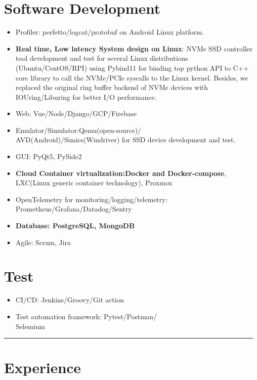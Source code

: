 \documentclass[11pt]{article}
\begin{document}
\begin{multicols*}{2}
\section*{Software Development}\label{software-dev}
\begin{itemize}[noitemsep]
    \item Profiler: perfetto/logcat/protobuf on Android Linux platform.
    \item \textbf{Real time, Low latency System design on Linux}: NVMe SSD controller tool development and test for several Linux distributions (Ubuntu/CentOS/RPI) using Pybind11 for binding top python API to C++ core library to call the NVMe/PCIe syscalls to the Linux kernel. Besides, we replaced the original ring buffer backend of  NVMe devices with IOUring/Liburing for better I/O performance.
    \item Web: Vue/Node/Django/GCP/Firebase
    \item Emulator/Simulator:Qemu(open-source)/\\AVD(Android)/Simics(Windriver) for SSD device development and test.
    \item GUI: PyQt5, PySide2
    \item \textbf{Cloud Container virtualization:Docker and Docker-compose}, LXC(Linux generic container technology), Proxmox
    \item OpenTelemetry for monitoring/logging/telemetry:\\ Prometheus/Grafana/Datadog/Sentry
    \item \textbf{Database: PostgreSQL, MongoDB}
    \item Agile: Scrum, Jira
\end{itemize}

\section*{Test}
\begin{itemize}[noitemsep]
    \item CI/CD: Jenkins/Groovy/Git action
    \item Test automation framework: Pytest/Postman/\\Selemium
\end{itemize}

\hrule
 
\section*{Experience}\label{experience}


\end{multicols*}
\end{document}
